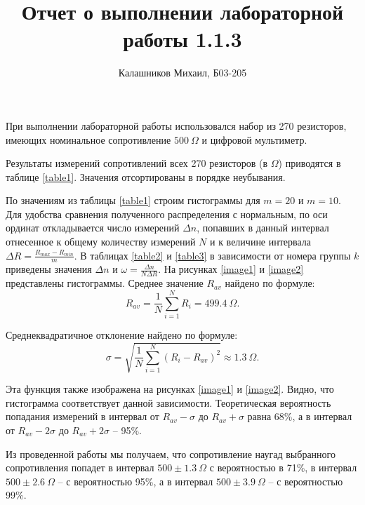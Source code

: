 \documentclass[14pt, a4paper]{article}
\title{\textbf{Отчет о выполнении лабораторной работы 1.1.3}}
\author{Калашников Михаил, Б03-205}
\date{}
\begin{document}
\maketitle

При выполнении лабораторной работы использовался набор из 270 резисторов, имеющих номинальное сопротивление $500\ \Omega$ и цифровой мультиметр.
\par
Результаты измерений сопротивлений всех 270 резисторов (в $\Omega$) приводятся в таблице \ref{table1}. Значения отсортированы в порядке неубывания.
\par
По значениям из таблицы \ref{table1} строим гистограммы для $m=20$ и $m=10$. Для удобства сравнения полученного распределения с нормальным, по оси ординат откладывается число измерений $\Delta n$, попавших в данный интервал отнесенное к общему количеству измерений $N$ и к величине интервала $\Delta R=\frac{R_{max}-R_{min}}{m}$. В таблицах \ref{table2} и \ref{table3} в зависимости от номера группы $k$ приведены значения $\Delta n$ и $\omega=\frac{\Delta n}{N\Delta R}$. На рисунках \ref{image1} и \ref{image2} представлены гистограммы. Среднее значение $R_{av}$ найдено по формуле:
\[R_{av}=\frac{1}{N}\sum_{i=1}^{N}R_i=499.4\ \Omega.\]
\par
Среднеквадратичное отклонение найдено по формуле:
\[\sigma=\sqrt{\frac{1}{N}\sum_{i=1}^{N}\left(R_i-R_{av}\right)^2}\approx1.3\ \Omega.\]
\par
Эта функция также изображена на рисунках \ref{image1} и \ref{image2}. Видно, что гистограмма соответствует данной зависимости. Теоретическая вероятность попадания измерений в интервал от $R_{av}-\sigma$ до $R_{av}+\sigma$ равна 68\%, а в интервал от $R_{av}-2\sigma$ до $R_{av}+2\sigma$ -- 95\%.
\par
Из проведенной работы мы получаем, что сопротивление наугад выбранного сопротивления попадет в интервал $500\pm1.3\ \Omega$ с вероятностью в 71\%, в интервал $500\pm2.6\ \Omega$ – с вероятностью 95\%, а в интервал $500\pm3.9\ \Omega$ – с вероятностью 99\%.
\end{document}
